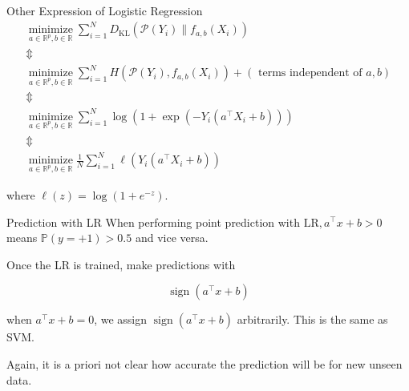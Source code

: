 \begin{frame}[allowframebreaks]

\begin{myconceptblock}{3.13}{Other Expression of Logistic Regression}
    $$
    \begin{gathered}
    \underset{a \in \mathbb{R}^{p}, b \in \mathbb{R}}{\operatorname{minimize}} \sum_{i=1}^{N} D_{\mathrm{KL}}\left(\mathcal{P}\left(Y_{i}\right) \| f_{a, b}\left(X_{i}\right)\right) \\
    \mathbb{\Updownarrow} \\
    \underset{a \in \mathbb{R}^{p}, b \in \mathbb{R}}{\operatorname{minimize}} \sum_{i=1}^{N} H\left(\mathcal{P}\left(Y_{i}\right), f_{a, b}\left(X_{i}\right)\right)+(\text { terms independent of } a, b) \\
    \mathbb{\Updownarrow} \\
    \underset{a \in \mathbb{R}^{p}, b \in \mathbb{R}}{\operatorname{minimize}} \sum_{i=1}^{N} \log \left(1+\exp \left(-Y_{i}\left(a^{\top} X_{i}+b\right)\right)\right) \\
    \mathbb{\Updownarrow} \\
    \underset{a \in \mathbb{R}^{p}, b \in \mathbb{R}}{\operatorname{minimize}} \frac{1}{N} \sum_{i=1}^{N} \ell\left(Y_{i}\left(a^{\top} X_{i}+b\right)\right)
    \end{gathered}
    $$

    where $\ell(z)=\log \left(1+e^{-z}\right)$.
\end{myconceptblock}

\end{frame}

\begin{frame}[allowframebreaks]

\begin{myconceptblock}{3.14}{Prediction with LR}
    When performing point prediction with $\mathrm{LR}, a^{\top} x+b>0$ means $\mathbb{P}(y=+1)>0.5$ and vice versa.

    Once the LR is trained, make predictions with

    $$
    \operatorname{sign}\left(a^{\top} x+b\right)
    $$

    when $a^{\top} x+b=0$, we assign $\operatorname{sign}\left(a^{\top} x+b\right)$ arbitrarily. This is the same as SVM.

    Again, it is a priori not clear how accurate the prediction will be for new unseen data.
\end{myconceptblock}

\end{frame}

